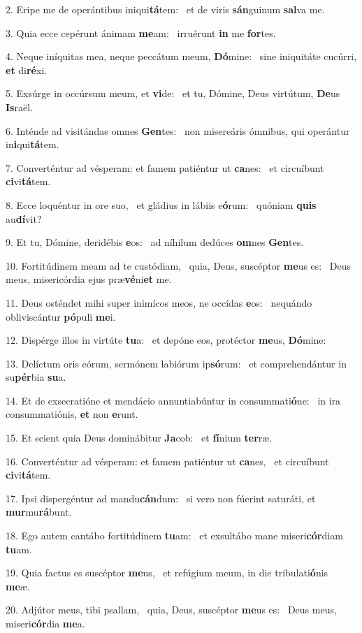 2. Eripe me de operántibus iniqui\textbf{tá}tem: \ast\  et de viris \textbf{sán}guinum \textbf{sal}va me.\

3. Quia ecce cepérunt ánimam \textbf{me}am: \ast\  irruérunt \textbf{in} me \textbf{for}tes.\

4. Neque iníquitas mea, neque peccátum meum, \textbf{Dó}mine: \ast\  sine iniquitáte cucúrri, \textbf{et} di\textbf{ré}xi.\

5. Exsúrge in occúrsum meum, et \textbf{vi}de: \ast\  et tu, Dómine, Deus virtútum, \textbf{De}us \textbf{Is}raël.\

6. Inténde ad visitándas omnes \textbf{Gen}tes: \ast\  non misereáris ómnibus, qui operántur in\textbf{i}qui\textbf{tá}tem.\

7. Converténtur ad vésperam: et famem patiéntur ut \textbf{ca}nes: \ast\  et circuíbunt \textbf{ci}vi\textbf{tá}tem.\

8. Ecce loquéntur in ore suo, \dag\  et gládius in lábiis e\textbf{ó}rum: \ast\  quóniam \textbf{quis} au\textbf{dí}vit?\

9. Et tu, Dómine, deridébis \textbf{e}os: \ast\  ad níhilum dedúces \textbf{om}nes \textbf{Gen}tes.\

10. Fortitúdinem meam ad te custódiam, \dag\  quia, Deus, suscéptor \textbf{me}us es: \ast\  Deus meus, misericórdia ejus præ\textbf{vé}ni\textbf{et} me.\

11. Deus osténdet mihi super inimícos meos, ne occídas \textbf{e}os: \ast\  nequándo obliviscántur \textbf{pó}puli \textbf{me}i.\

12. Dispérge illos in virtúte \textbf{tu}a: \ast\  et depóne eos, protéctor \textbf{me}us, \textbf{Dó}mine:\

13. Delíctum oris eórum, sermónem labiórum ip\textbf{só}rum: \ast\  et comprehendántur in su\textbf{pér}bia \textbf{su}a.\

14. Et de exsecratióne et mendácio annuntiabúntur in consummati\textbf{ó}ne: \ast\  in ira consummatiónis, \textbf{et} non \textbf{e}runt.\

15. Et scient quia Deus dominábitur \textbf{Ja}cob: \ast\  et \textbf{fí}nium \textbf{ter}ræ.\

16. Converténtur ad vésperam: et famem patiéntur ut \textbf{ca}nes, \ast\  et circuíbunt \textbf{ci}vi\textbf{tá}tem.\

17. Ipsi dispergéntur ad mandu\textbf{cán}dum: \ast\  si vero non fúerint saturáti, et \textbf{mur}mu\textbf{rá}bunt.\

18. Ego autem cantábo fortitúdinem \textbf{tu}am: \ast\  et exsultábo mane miseri\textbf{cór}diam \textbf{tu}am.\

19. Quia factus es suscéptor \textbf{me}us, \ast\  et refúgium meum, in die tribulati\textbf{ó}nis \textbf{me}æ.\

20. Adjútor meus, tibi psallam, \dag\  quia, Deus, suscéptor \textbf{me}us es: \ast\  Deus meus, miseri\textbf{cór}dia \textbf{me}a.\

